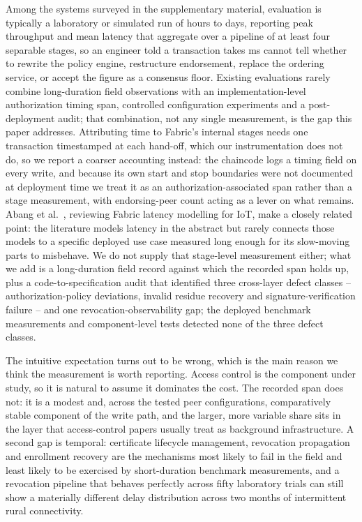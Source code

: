 Among the systems surveyed in the supplementary material, evaluation is typically a laboratory or simulated run of hours to days, reporting peak throughput and mean latency that aggregate over a pipeline of at least four separable stages, so an engineer told a transaction takes \TotalLatencyPeerFour{} ms cannot tell whether to rewrite the policy engine, restructure endorsement, replace the ordering service, or accept the figure as a consensus floor. Existing evaluations rarely combine long-duration field observations with an implementation-level authorization timing span, controlled configuration experiments and a post-deployment audit; that combination, not any single measurement, is the gap this paper addresses. Attributing time to Fabric's internal stages needs one transaction timestamped at each hand-off, which our instrumentation does not do, so we report a coarser accounting instead: the chaincode logs a timing field on every write, and because its own start and stop boundaries were not documented at deployment time we treat it as an authorization-associated span rather than a stage measurement, with endorsing-peer count acting as a lever on what remains. Abang et al.\ \citep{abang2024latency}, reviewing Fabric latency modelling for IoT, make a closely related point: the literature models latency in the abstract but rarely connects those models to a specific deployed use case measured long enough for its slow-moving parts to misbehave. We do not supply that stage-level measurement either; what we add is a long-duration field record against which the recorded span holds up, plus a code-to-specification audit that identified three cross-layer defect classes -- authorization-policy deviations, invalid residue recovery and signature-verification failure -- and one revocation-observability gap; the deployed benchmark measurements and component-level tests detected none of the three defect classes.

The intuitive expectation turns out to be wrong, which is the main reason we think the measurement is worth reporting. Access control is the component under study, so it is natural to assume it dominates the cost. The recorded span does not: it is a modest and, across the tested peer configurations, comparatively stable component of the write path, and the larger, more variable share sits in the layer that access-control papers usually treat as background infrastructure. A second gap is temporal: certificate lifecycle management, revocation propagation and enrollment recovery are the mechanisms most likely to fail in the field and least likely to be exercised by short-duration benchmark measurements, and a revocation pipeline that behaves perfectly across fifty laboratory trials can still show a materially different delay distribution across two months of intermittent rural connectivity.

